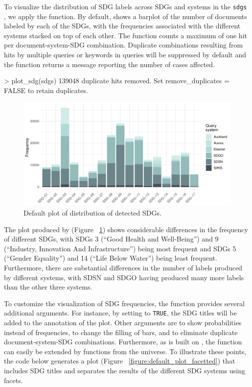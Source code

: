 To visualize the distribution of SDG labels across SDGs and systems in the \texttt{sdgs} , we apply the  function. By default,  shows a barplot of the number of documents labeled by each of the SDGs, with the frequencies associated with the different systems stacked on top of each other. The function counts a maximum of one hit per document-system-SDG combination. Duplicate combinations resulting from hits by multiple queries or keywords in queries will be suppressed by default and the function returns a message reporting the number of cases affected.

\begin{example}

> plot_sdg(sdgs)
139048 duplicate hits removed. Set remove_duplicates = FALSE to retain duplicates.
\end{example}

\begin{figure}[htbp]
  \centering
   \includegraphics[width=1\linewidth]{default_plot_revision.pdf}
  \caption{Default plot of distribution of detected SDGs.}
  \label{figure:default_plot}
\end{figure}

The plot produced by  (Figure ~\ref{figure:default_plot}) shows considerable differences in the frequency of different SDGs, with SDGs 3 (“Good Health and Well-Being”) and 9 (“Industry, Innovation And Infrastructure”) being most frequent and SDGs 5 (“Gender Equality”) and 14 (“Life Below Water”) being least frequent. Furthermore, there are substantial differences in the number of labels produced by different systems, with SDSN and SDGO having produced many more labels than the other three systems. 

To customize the visualization of SDG frequencies, the  function provides several additional arguments. For instance, by setting  to \texttt{TRUE}, the SDG titles will be added to the annotation of the plot. Other arguments are  to show probabilities instead of frequencies,  to change the filling of bars, and  to eliminate duplicate document-system-SDG combinations. Furthermore, as  is built on  \citep{ggplot2}, the function can easily be extended by functions from the  universe. To illustrate these points, the code below generates a plot (Figure ~\ref{figure:default_plot_facetted}) that includes SDG titles and separates the results of the different SDG systems using facets.

